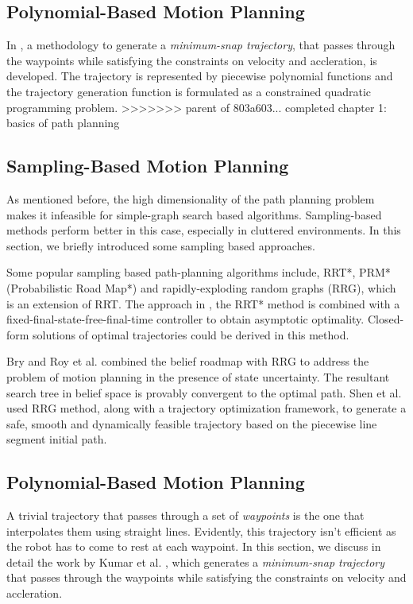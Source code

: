 \subsection{Polynomial-Based Motion Planning}
In \cite{mellinger2011minimum}, a methodology to generate a \textit{minimum-snap trajectory}, that passes through the waypoints while satisfying the constraints on velocity and accleration, is developed. The trajectory is represented by piecewise polynomial functions and the trajectory generation function is formulated as a constrained quadratic programming problem. 
>>>>>>> parent of 803a603... completed chapter 1: basics of path planning

\subsection{Sampling-Based Motion Planning}
\label{sec:sampling_planning}
As mentioned before, the high dimensionality of the path planning problem makes it infeasible for simple-graph search based algorithms. Sampling-based methods perform better in this case, especially in cluttered environments. In this section, we briefly introduced some sampling based approaches. 

Some popular sampling based path-planning algorithms include, RRT*, PRM* (Probabilistic Road Map*) and rapidly-exploding random graphs (RRG), which is an extension of RRT. The approach in \cite{webb2013kinodynamic}, the RRT* method is combined with a fixed-final-state-free-final-time controller to obtain asymptotic optimality. Closed-form solutions of optimal trajectories could be derived in this method. 

Bry and Roy et al. \cite{bry2011rapidly} combined the belief roadmap with RRG to address the problem of motion planning in the presence of state uncertainty. The resultant search tree in belief space is provably convergent to the optimal path. Shen et al. \cite{shen2017gradient} used RRG method, along with a trajectory optimization framework, to generate a safe, smooth and dynamically feasible trajectory based on the piecewise line segment initial path. 

\subsection{Polynomial-Based Motion Planning}
\label{sec:poly_based_planning}
A trivial trajectory that passes through a set of \textit{waypoints} is the one that interpolates them using straight lines. Evidently, this trajectory isn't efficient as the robot has to come to rest at each waypoint. In this section, we discuss in detail the work by Kumar et al. \cite{mellinger2011minimum}, which generates a \textit{minimum-snap trajectory} that passes through the waypoints while satisfying the constraints on velocity and accleration. 

